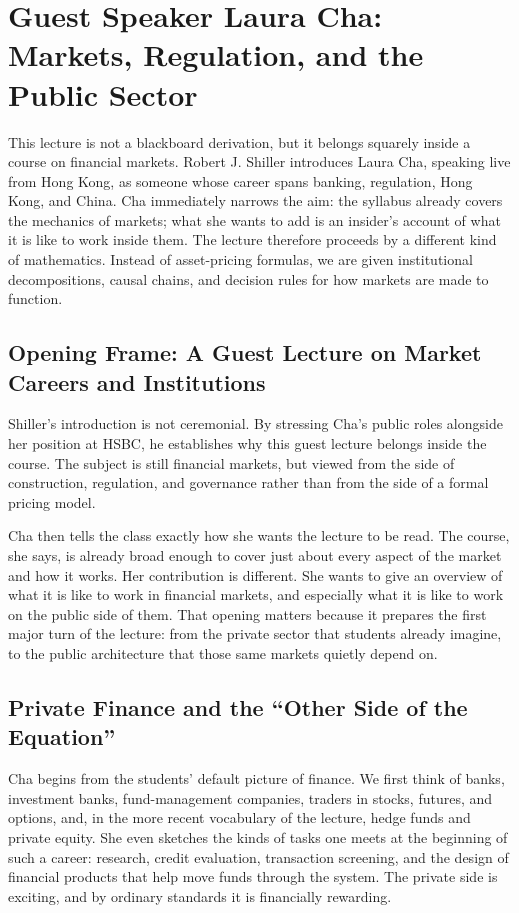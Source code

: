 \chapter{Guest Speaker Laura Cha: Markets, Regulation, and the Public Sector}

This lecture is not a blackboard derivation, but it belongs squarely inside a course on financial markets. Robert J. Shiller introduces Laura Cha, speaking live from Hong Kong, as someone whose career spans banking, regulation, Hong Kong, and China. Cha immediately narrows the aim: the syllabus already covers the mechanics of markets; what she wants to add is an insider's account of what it is like to work inside them. The lecture therefore proceeds by a different kind of mathematics. Instead of asset-pricing formulas, we are given institutional decompositions, causal chains, and decision rules for how markets are made to function.

\section{Opening Frame: A Guest Lecture on Market Careers and Institutions}

Shiller's introduction is not ceremonial. By stressing Cha's public roles alongside her position at HSBC, he establishes why this guest lecture belongs inside the course. The subject is still financial markets, but viewed from the side of construction, regulation, and governance rather than from the side of a formal pricing model.

Cha then tells the class exactly how she wants the lecture to be read. The course, she says, is already broad enough to cover just about every aspect of the market and how it works. Her contribution is different. She wants to give an overview of what it is like to work in financial markets, and especially what it is like to work on the public side of them. That opening matters because it prepares the first major turn of the lecture: from the private sector that students already imagine, to the public architecture that those same markets quietly depend on.

\section{Private Finance and the ``Other Side of the Equation''}

Cha begins from the students' default picture of finance. We first think of banks, investment banks, fund-management companies, traders in stocks, futures, and options, and, in the more recent vocabulary of the lecture, hedge funds and private equity. She even sketches the kinds of tasks one meets at the beginning of such a career: research, credit evaluation, transaction screening, and the design of financial products that help move funds through the system. The private side is exciting, and by ordinary standards it is financially rewarding.

